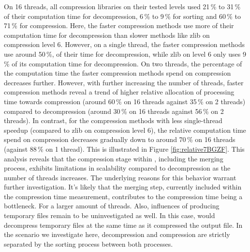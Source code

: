 On 16 threads, all compression libraries on their tested levels used 21\,\% to 31\,\% of their computation time for decompression, 6\,\% to 9\,\% for sorting and 60\,\% to 71\,\% for compression. Here, the faster compression methods use more of their computation time for decompression than slower methods like zlib on compression level 6. However, on a single thread, the faster compression methods use around 50\,\%, of their time for decompression, while zlib on level 6 only uses 9\,\% of its computation time for decompression. On two threads, the percentage of the computation time the faster compression methods spend on compression decreases further. However, with further increasing the number of threads, faster compression methods reveal a trend of higher relative allocation of processing time towards compression (around 60\,\% on 16 threads against 35\,\% on 2 threads) compared to decompression (around 30\,\% on 16 threads against 56\,\% on 2 threads). In contrast, for the compression methods with less single-thread speedup (compared to zlib on compression level 6), the relative computation time spend on compression decreases gradually down to around 70\,\% on 16 threads (against 88\,\% on 1 thread). This is illustrated in Figure \ref{fig:relative7BGZF}.
This analysis reveals that the compression stage within \sort, including the merging process, exhibits limitations in scalability compared to decompression as the number of threads increases. The underlying reasons for this behavior warrant further investigation. It's likely that the merging step, currently included within the compression time measurement, contributes to the compression time being a bottleneck. For a larger amount of threads. 
Also, influences of \sort producing temporary files remain to be uninvestigated as well. In this case, \sort would decompress temporary files at the same time as it compressed the output file. In the scenario we investigate here, decompression and compression are strictly separated by the sorting process between both processes.


